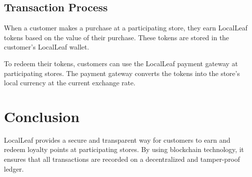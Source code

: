 \documentclass{article}
\begin{document}
\subsection{Transaction Process}

When a customer makes a purchase at a participating store, they earn LocalLeaf tokens based on the value of their purchase. These tokens are stored in the customer's LocalLeaf wallet.

To redeem their tokens, customers can use the LocalLeaf payment gateway at participating stores. The payment gateway converts the tokens into the store's local currency at the current exchange rate.

\section{Conclusion}

LocalLeaf provides a secure and transparent way for customers to earn and redeem loyalty points at participating stores. By using blockchain technology, it ensures that all transactions are recorded on a decentralized and tamper-proof ledger.
\end{document}
